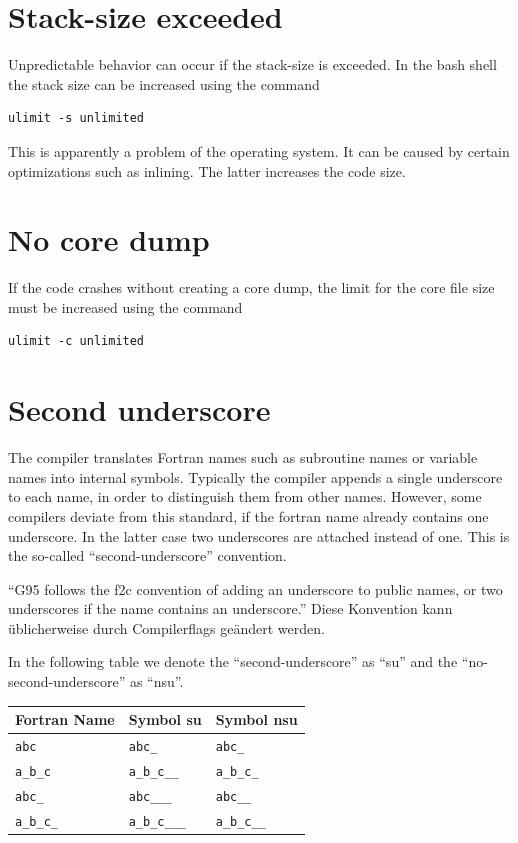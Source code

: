 \documentclass[a4paper,10pt]{report}
\begin{document}
\section{Stack-size exceeded}
Unpredictable behavior can occur if the
stack-size is exceeded. In the bash shell the stack size can be
increased using the command
\begin{verbatim}
ulimit -s unlimited
\end{verbatim}
 This is apparently a problem of the operating system. It can be
caused by certain optimizations such as inlining. The latter increases
the code size.

\section{No core dump}
If the code crashes without creating a core dump,
the limit for the core file size must be increased using the command
\begin{verbatim}
ulimit -c unlimited
\end{verbatim}

\section{Second underscore}
The compiler translates Fortran names such as subroutine names or
variable names into internal symbols. Typically the compiler appends a
single underscore to each name, in order to distinguish them from
other names. However, some compilers deviate from this standard, if
the fortran name already contains one underscore. In the latter case
two underscores are attached instead of one. This is the so-called
``second-underscore'' convention.
\begin{center}
``G95 follows the f2c convention of adding an underscore to public
names, or two underscores if the name contains an underscore.'' Diese
Konvention kann \"ublicherweise durch Compilerflags ge\"andert werden.
\end{center}

In the following table we denote the ``second-underscore'' as ``su''
and the ``no-second-underscore'' as ``nsu''.
\begin{center}
\begin{tabular}{|l|l|l|}
\hline
Fortran Name & Symbol su & Symbol nsu\\
\hline
\verb+abc+ & \verb+abc_+ &\verb+abc_+\\
\verb+a_b_c+ & \verb+a_b_c__+& \verb+a_b_c_+\\
\verb+abc_+ & \verb+abc___+& \verb+abc__+ \\
\verb+a_b_c_+ & \verb+a_b_c___+& \verb+a_b_c__+\\
\hline
\end{tabular}
\end{center}
\end{document}

